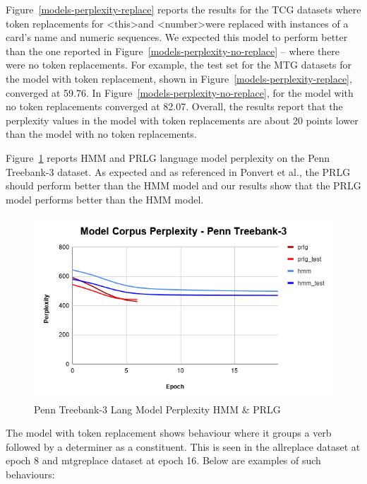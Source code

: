 \documentclass[11pt,a4paper]{article}
\begin{document}
Figure~\ref{models-perplexity-replace} reports the results for the TCG datasets where token replacements for \textless this\textgreater and \textless number\textgreater  were replaced with instances of a card’s name and numeric sequences. We expected this model to perform better than the one reported in Figure~\ref{models-perplexity-no-replace} -- where there were no token replacements. For example, the test set for the MTG datasets for the model with token replacement, shown in Figure~\ref{models-perplexity-replace}, converged at 59.76. In Figure~\ref{models-perplexity-no-replace}, for the model with no token replacements converged at 82.07. Overall, the results report that the perplexity values in the model with token replacements are about 20 points lower than the model with no token replacements.

Figure~\ref{treebank-3-comparison} reports HMM and PRLG language model perplexity on the Penn Treebank-3 dataset. As expected and as referenced in Ponvert et al., the PRLG should perform better than the HMM model and our results show that the PRLG model performs better than the HMM model.

\begin{figure}[h]
	\includegraphics[width=\linewidth]{treebank_3_comparison.png}
	\caption{\label{treebank-3-comparison} Penn Treebank-3 Lang Model Perplexity HMM \& PRLG }
\end{figure}

The model with token replacement shows behaviour where it groups a verb followed by a determiner as a constituent. This is seen in the all\textunderscore replace dataset at epoch 8 and mtg\textunderscore replace dataset at epoch 16. Below are examples of such behaviours:

\hspace{0.05in}
\vspace{0.2in}
\end{document}
